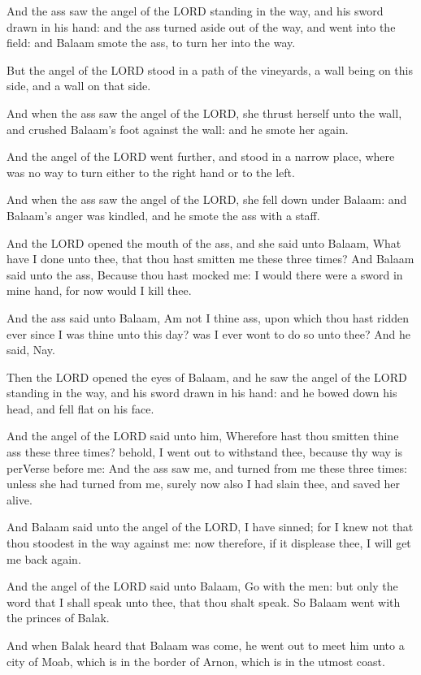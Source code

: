 \Verse And the ass saw the angel of the LORD standing in the way, and
his sword drawn in his hand: and the ass turned aside out of the way,
and went into the field: and Balaam smote the ass, to turn her into
the way.

\Verse But the angel of the LORD stood in a path of the vineyards, a
wall being on this side, and a wall on that side.

\Verse And when the ass saw the angel of the LORD, she thrust herself
unto the wall, and crushed Balaam's foot against the wall: and he
smote her again.

\Verse And the angel of the LORD went further, and stood in a narrow
place, where was no way to turn either to the right hand or to the
left.

\Verse And when the ass saw the angel of the LORD, she fell down under
Balaam: and Balaam's anger was kindled, and he smote the ass with a
staff.

\Verse And the LORD opened the mouth of the ass, and she said unto
Balaam, What have I done unto thee, that thou hast smitten me these
three times?  \Verse And Balaam said unto the ass, Because thou hast
mocked me: I would there were a sword in mine hand, for now would I
kill thee.

\Verse And the ass said unto Balaam, Am not I thine ass, upon which
thou hast ridden ever since I was thine unto this day? was I ever wont
to do so unto thee? And he said, Nay.

\Verse Then the LORD opened the eyes of Balaam, and he saw the angel of
the LORD standing in the way, and his sword drawn in his hand: and he
bowed down his head, and fell flat on his face.

\Verse And the angel of the LORD said unto him, Wherefore hast thou
smitten thine ass these three times? behold, I went out to withstand
thee, because thy way is perVerse before me: \Verse And the ass saw me,
and turned from me these three times: unless she had turned from me,
surely now also I had slain thee, and saved her alive.

\Verse And Balaam said unto the angel of the LORD, I have sinned; for I
knew not that thou stoodest in the way against me: now therefore, if
it displease thee, I will get me back again.

\Verse And the angel of the LORD said unto Balaam, Go with the men: but
only the word that I shall speak unto thee, that thou shalt speak. So
Balaam went with the princes of Balak.

\Verse And when Balak heard that Balaam was come, he went out to meet
him unto a city of Moab, which is in the border of Arnon, which is in
the utmost coast.

